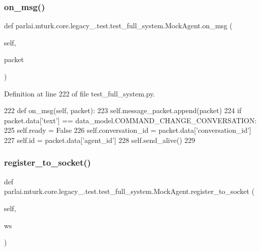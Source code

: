 \subsubsection{\texorpdfstring{on\+\_\+msg()}{on\_msg()}}
{\footnotesize\ttfamily def parlai.\+mturk.\+core.\+legacy\+\_.\+test.\+test\+\_\+full\+\_\+system.\+Mock\+Agent.\+on\+\_\+msg (\begin{DoxyParamCaption}\item[{}]{self,  }\item[{}]{packet }\end{DoxyParamCaption})}



Definition at line 222 of file test\+\_\+full\+\_\+system.\+py.


\begin{DoxyCode}
222     \textcolor{keyword}{def }on\_msg(self, packet):
223         self.message\_packet.append(packet)
224         \textcolor{keywordflow}{if} packet.data[\textcolor{stringliteral}{'text'}] == data\_model.COMMAND\_CHANGE\_CONVERSATION:
225             self.ready = \textcolor{keyword}{False}
226             self.conversation\_id = packet.data[\textcolor{stringliteral}{'conversation\_id'}]
227             self.id = packet.data[\textcolor{stringliteral}{'agent\_id'}]
228             self.send\_alive()
229 
\end{DoxyCode}
\mbox{\label{classparlai_1_1mturk_1_1core_1_1legacy__2018_1_1test_1_1test__full__system_1_1MockAgent_ad7789e7557ac736ec45b43854c998d57}} 
\subsubsection{\texorpdfstring{register\+\_\+to\+\_\+socket()}{register\_to\_socket()}}
{\footnotesize\ttfamily def parlai.\+mturk.\+core.\+legacy\+\_.\+test.\+test\+\_\+full\+\_\+system.\+Mock\+Agent.\+register\+\_\+to\+\_\+socket (\begin{DoxyParamCaption}\item[{}]{self,  }\item[{}]{ws }\end{DoxyParamCaption})}



